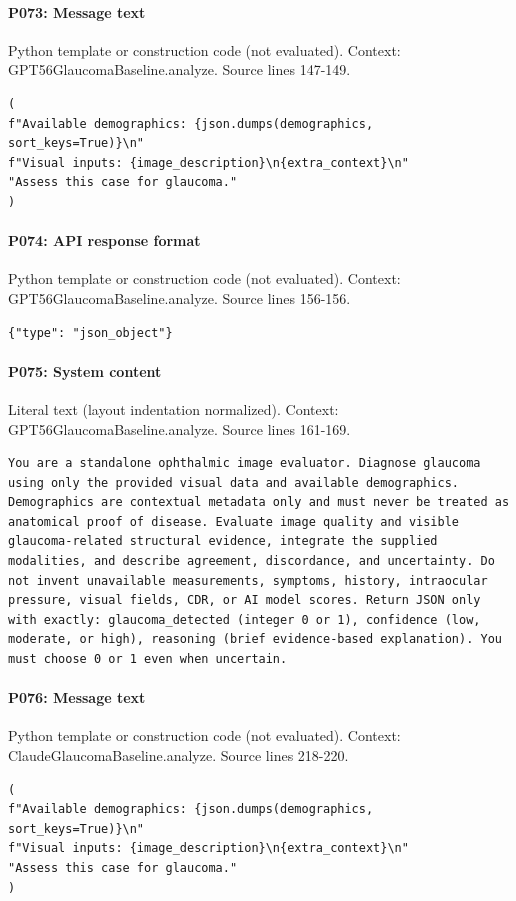 \documentclass[10pt]{article}
\begin{document}
\paragraph{P073: Message text}
Python template or construction code (not evaluated). Context: GPT56GlaucomaBaseline.analyze. Source lines 147-149.
\begin{Verbatim}
(
f"Available demographics: {json.dumps(demographics, sort_keys=True)}\n"
f"Visual inputs: {image_description}\n{extra_context}\n"
"Assess this case for glaucoma."
)
\end{Verbatim}
\paragraph{P074: API response format}
Python template or construction code (not evaluated). Context: GPT56GlaucomaBaseline.analyze. Source lines 156-156.
\begin{Verbatim}
{"type": "json_object"}
\end{Verbatim}
\paragraph{P075: System content}
Literal text (layout indentation normalized). Context: GPT56GlaucomaBaseline.analyze. Source lines 161-169.
\begin{Verbatim}
You are a standalone ophthalmic image evaluator. Diagnose glaucoma using only the provided visual data and available demographics. Demographics are contextual metadata only and must never be treated as anatomical proof of disease. Evaluate image quality and visible glaucoma-related structural evidence, integrate the supplied modalities, and describe agreement, discordance, and uncertainty. Do not invent unavailable measurements, symptoms, history, intraocular pressure, visual fields, CDR, or AI model scores. Return JSON only with exactly: glaucoma_detected (integer 0 or 1), confidence (low, moderate, or high), reasoning (brief evidence-based explanation). You must choose 0 or 1 even when uncertain.
\end{Verbatim}
\paragraph{P076: Message text}
Python template or construction code (not evaluated). Context: ClaudeGlaucomaBaseline.analyze. Source lines 218-220.
\begin{Verbatim}
(
f"Available demographics: {json.dumps(demographics, sort_keys=True)}\n"
f"Visual inputs: {image_description}\n{extra_context}\n"
"Assess this case for glaucoma."
)
\end{Verbatim}
\end{document}
